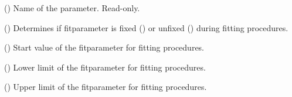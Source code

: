 \documentclass[letterpaper,10pt,english]{sphinxmanual}
\begin{document}
\begin{fulllineitems}
\begin{fulllineitems}
\end{fulllineitems}


\begin{fulllineitems}
\label{\detokenize{modules-api/parameters:Parameters.Fitparameter.name}}
() Name of the parameter. Read-only.

\end{fulllineitems}


\begin{fulllineitems}
\label{\detokenize{modules-api/parameters:Parameters.Fitparameter.fixed}}
() Determines if fitparameter is fixed () or unfixed () during fitting procedures.

\end{fulllineitems}


\begin{fulllineitems}
\label{\detokenize{modules-api/parameters:Parameters.Fitparameter.start_val}}
() Start value of the fitparameter for fitting procedures.

\end{fulllineitems}


\begin{fulllineitems}
\label{\detokenize{modules-api/parameters:Parameters.Fitparameter.lower_lim}}
() Lower limit of the fitparameter for fitting procedures.

\end{fulllineitems}


\begin{fulllineitems}
\label{\detokenize{modules-api/parameters:Parameters.Fitparameter.upper_lim}}
() Upper limit of the fitparameter for fitting procedures.


\end{fulllineitems}
\end{fulllineitems}
\end{document}
